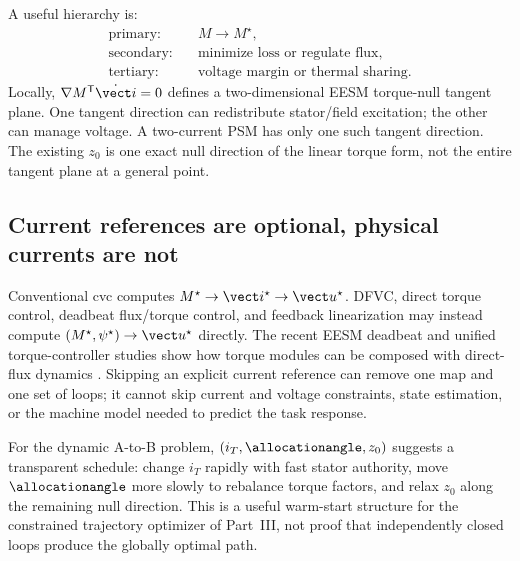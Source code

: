 A useful hierarchy is:
\begin{align*}
 \text{primary:}&\quad M\to M^\star,\\
 \text{secondary:}&\quad \text{minimize loss or regulate flux},\\
 \text{tertiary:}&\quad \text{voltage margin or thermal sharing}.
\end{align*}
Locally, \(\nabla M^{\mathsf T}\dot{\vect i}=0\) defines a two-dimensional
EESM torque-null tangent plane. One tangent direction can redistribute
stator/field excitation; the other can manage voltage. A two-current PSM has
only one such tangent direction. The existing \(z_0\) is one exact null
direction of the linear torque form, not the entire tangent plane at a general
point.



\subsection{Current references are optional, physical currents are not}

Conventional \gls{cvc} computes
\(M^\star\to\vect i^\star\to\vect u^\star\). DFVC, direct torque control,
deadbeat flux/torque control, and feedback linearization may instead compute
\((M^\star,\psi^\star)\to\vect u^\star\) directly. The recent EESM deadbeat and
unified torque-controller studies show how torque modules can be composed with
direct-flux dynamics \cite{rubino2026deadbeat,ionta2026unified}. Skipping an
explicit current reference can remove one map and one set of loops; it cannot
skip current and voltage constraints, state estimation, or the machine model
needed to predict the task response.

For the dynamic A-to-B problem, \((i_T,\allocationangle,z_0)\) suggests a transparent
schedule: change \(i_T\) rapidly with fast stator authority, move \(\allocationangle\)
more slowly to rebalance torque factors, and relax \(z_0\) along the remaining
null direction. This is a useful warm-start structure for the constrained
trajectory optimizer of Part~III, not proof that independently closed loops
produce the globally optimal path.
